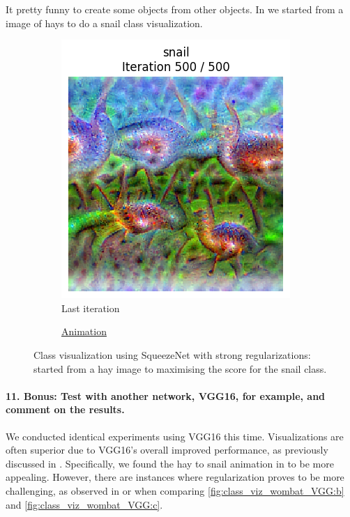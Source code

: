 It pretty funny to create some objects from other objects. In  we started from a image of hays to do a snail class visualization.

\begin{figure}[H]
    \centering
    \begin{subfigure}{.5\textwidth}
        \centering
        \includegraphics[width=.7\linewidth]{SqueezeNet/snail_animated_init_img_reg++_last_frame.png}
        \caption{Last iteration}
        \label{fig:class_viz_start_image_dif:png}
    \end{subfigure}%
    \begin{subfigure}{.5\textwidth}
        \centering
        \caption{\href{figs/2b/SqueezeNet/snail_animated_init_img_reg++.gif}{Animation}}
        \label{fig:class_viz_start_image_dif:vid}
    \end{subfigure}
    \caption{Class visualization using SqueezeNet with strong regularizations: started from a hay image to maximising the score for the snail class.}
    \label{fig:class_viz_start_image_dif}
\end{figure}

\paragraph*{11. \textbf{Bonus:} Test with another network, VGG16, for example, and comment on the results.}
We conducted identical experiments using VGG16 this time. Visualizations are often superior due to VGG16's overall improved performance, as previously discussed in . Specifically, we found the hay to snail animation in  to be more appealing. However, there are instances where regularization proves to be more challenging, as observed in  or when comparing \ref{fig:class_viz_wombat_VGG:b} and \ref{fig:class_viz_wombat_VGG:c}.


